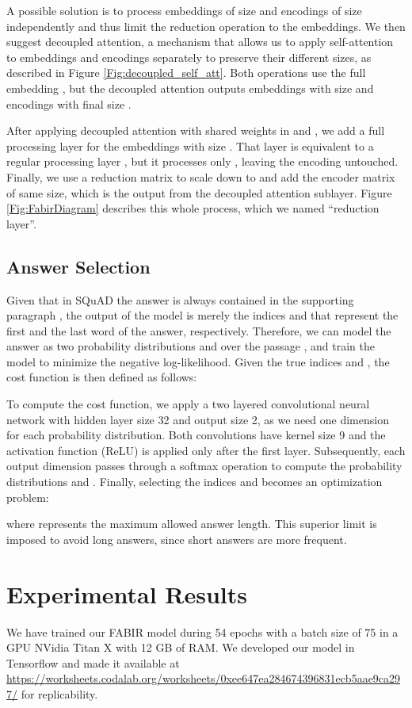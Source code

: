 \documentclass[conference, letterpaper, 10pt]{IEEEtran}
\begin{document}
A possible solution is to process embeddings of size  and encodings of size  independently and thus limit the reduction operation to the embeddings. We then suggest decoupled attention, a mechanism that allows us to apply self-attention to embeddings and encodings separately to preserve their different sizes, as described in Figure \ref{Fig:decoupled_self_att}.
Both operations use the full embedding , but the decoupled attention outputs embeddings with size  and encodings with final size . 

After applying decoupled attention with shared weights in  and , we add a full processing layer for the embeddings  with size . That layer is equivalent to a regular processing layer , but it processes only , leaving the encoding  untouched.
Finally, we use a reduction matrix to scale  down to  and add the encoder matrix  of same size, which is the output from the decoupled attention sublayer.
Figure \ref{Fig:FabirDiagram} describes this whole process, which we named {``}reduction layer{''}.

\subsection{Answer Selection}
Given that in SQuAD the answer is always contained in the supporting paragraph , the output of the model is merely the indices  and  that represent the first and the last word of the answer, respectively. Therefore, we can model the answer as two probability distributions  and  over the passage , and train the model to minimize the negative log-likelihood. Given the true indices  and , the cost function is then defined as follows:



To compute the cost function, we apply a two layered convolutional neural network with hidden layer size 32 and output size 2, as we need one dimension for each probability distribution. Both convolutions have kernel size 9 and the activation function (ReLU) is applied only after the first layer. Subsequently, each output dimension  passes through a softmax operation to compute the probability distributions  and . Finally, selecting the indices  and  becomes an optimization problem:


where  represents the maximum allowed  answer length. This superior limit is imposed to avoid long answers, since short answers are more frequent.

\section{Experimental Results}
We have trained our FABIR model during 54 epochs with a batch size of 75 in a GPU NVidia Titan X with 12 GB of RAM. We developed our model in Tensorflow \cite{GoogleResearch2015} and made it available at \url{https://worksheets.codalab.org/worksheets/0xee647ea284674396831ecb5aae9ca297/} for replicability. 
\end{document}
